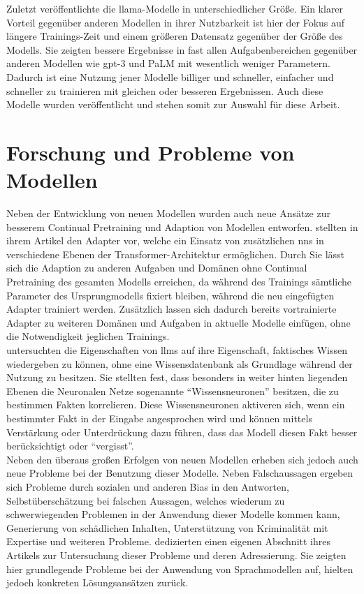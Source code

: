 Zuletzt veröffentlichte \citet{llama} die \ac{llama}-Modelle in unterschiedlicher Größe. 
Ein klarer Vorteil gegenüber anderen Modellen in ihrer Nutzbarkeit ist hier der Fokus auf längere Trainings-Zeit und einem größeren Datensatz gegenüber der Größe des Modells. 
Sie zeigten bessere Ergebnisse in fast allen Aufgabenbereichen gegenüber anderen Modellen wie \ac{gpt}-3 und \ac{PaLM} mit wesentlich weniger Parametern. 
Dadurch ist eine Nutzung jener Modelle billiger und schneller, einfacher und schneller zu trainieren mit gleichen oder besseren Ergebnissen. 
Auch diese Modelle wurden veröffentlicht und stehen somit zur Auswahl für diese Arbeit.

\section{Forschung und Probleme von Modellen}
Neben der Entwicklung von neuen Modellen wurden auch neue Ansätze zur besserem Continual Pretraining und Adaption von Modellen entworfen. 
\citet{adapterhub} stellten in ihrem Artikel den Adapter vor, welche ein Einsatz von zusätzlichen \ac{nn}s in verschiedene Ebenen der Transformer-Architektur ermöglichen.
Durch Sie lässt sich die Adaption zu anderen Aufgaben und Domänen ohne Continual Pretraining des gesamten Modells erreichen, da während des Trainings sämtliche Parameter des Ursprungmodells fixiert bleiben, während die neu eingefügten Adapter trainiert werden.
Zusätzlich lassen sich dadurch bereits vortrainierte Adapter zu weiteren Domänen und Aufgaben in aktuelle Modelle einfügen, ohne die Notwendigkeit jeglichen Trainings.\\

\citet{knowledge_neurons} untersuchten die Eigenschaften von \ac{llm}s auf ihre Eigenschaft, faktisches Wissen wiedergeben zu können, ohne eine Wissensdatenbank als Grundlage während der Nutzung zu besitzen.
Sie stellten fest, dass besonders in weiter hinten liegenden Ebenen die Neuronalen Netze sogenannte \enquote{Wissensneuronen} besitzen, die zu bestimmen Fakten korrelieren.
Diese Wissensneuronen aktiveren sich, wenn ein bestimmter Fakt in der Eingabe angesprochen wird und können mittels Verstärkung oder Unterdrückung dazu führen, dass das Modell diesen Fakt besser berücksichtigt oder \enquote{vergisst}.\\

Neben den überaus großen Erfolgen von neuen Modellen erheben sich jedoch auch neue Probleme bei der Benutzung dieser Modelle.
Neben Falschaussagen ergeben sich Probleme durch sozialen und anderen Bias in den Antworten, Selbstüberschätzung bei falschen Aussagen, welches wiederum zu schwerwiegenden Problemen in der Anwendung dieser Modelle kommen kann, Generierung von schädlichen Inhalten, Unterstützung von Kriminalität mit Expertise und weiteren Probleme.
\citet{gpt4} dedizierten einen eigenen Abschnitt ihres Artikels zur Untersuchung dieser Probleme und deren Adressierung.
Sie zeigten hier grundlegende Probleme bei der Anwendung von Sprachmodellen auf, hielten jedoch konkreten Lösungsansätzen zurück.\\

